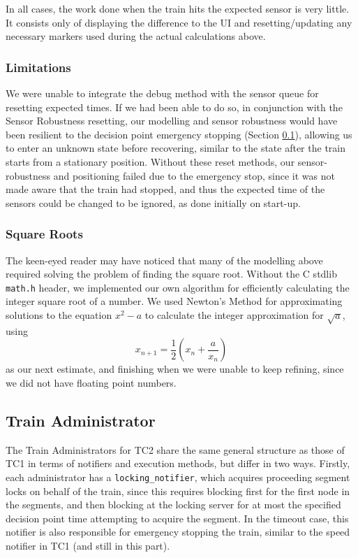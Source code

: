 \documentclass[12pt, titlepage]{article}
\begin{document}
    In all cases, the work done when the train hits the expected sensor is very little. It consists only of displaying the difference to the UI and resetting/updating any necessary markers used during the actual calculations above.
    
    \subsubsection{Limitations}
    \label{sec:limits}
    
    We were unable to integrate the debug method with the sensor queue for resetting expected times. If we had been able to do so, in conjunction with the Sensor Robustness resetting, our modelling and sensor robustness would have been resilient to the decision point emergency stopping (Section \ref{sec:train}), allowing us to enter an unknown state before recovering, similar to the state after the train starts from a stationary position. Without these reset methods, our sensor-robustness and positioning failed due to the emergency stop, since it was not made aware that the train had stopped, and thus the expected time of the sensors could be changed to be ignored, as done initially on start-up.
    
    \subsubsection{Square Roots}
    
    The keen-eyed reader may have noticed that many of the modelling above required solving the problem of finding the square root. Without the C stdlib \verb`math.h` header, we implemented our own algorithm for efficiently calculating the integer square root of a number. We used Newton's Method for approximating solutions to the equation $x^2 - a$ to calculate the integer approximation for $\sqrt a$, using
    \[
        x_{n+1} = \frac{1}{2}\left(x_n + \frac{a}{x_n}\right)
    \]
    as our next estimate, and finishing when we were unable to keep refining, since we did not have floating point numbers.
    
    \subsection{Train Administrator}
    \label{sec:train}
    
    The Train Administrators for TC2 share the same general structure as those of TC1 in terms of notifiers and execution methods, but differ in two ways. Firstly, each administrator has a \verb`locking_notifier`, which acquires proceeding segment locks on behalf of the train, since this requires blocking first for the first node in the segments, and then blocking at the locking server for at most the specified decision point time attempting to acquire the segment. In the timeout case, this notifier is also responsible for emergency stopping the train, similar to the speed notifier in TC1 (and still in this part).
    
\end{document}
